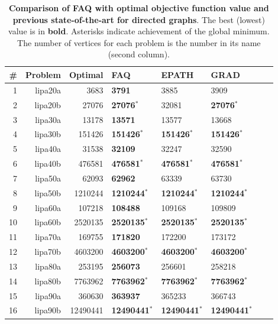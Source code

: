 \documentclass[10pt]{article}
\begin{document}
\begin{table}[h!]
\caption{{\bf Comparison of FAQ with optimal objective function value and previous state-of-the-art for directed graphs}.  The best (lowest) value is in \textbf{bold}. Asterisks indicate achievement of the global minimum.  The number of vertices for each problem is the number in its name (second column).}
\begin{center}
\begin{tabular}{|r|r|r||l|l|l|l|l|}
	\hline 
	          \# &  Problem &      Optimal & FAQ & EPATH & GRAD \\
	\hline 
	           1 &  lipa20a &     3683 & \textbf{3791} &     3885 &     3909 \\ 
	           2 &  lipa20b &    27076 & \textbf{27076}$^*$ &    32081 &    \textbf{27076}$^*$ \\ 
	           3 &  lipa30a &    13178 & \textbf{13571} 	&    13577 &    13668 \\ 
	           4 &  lipa30b &   151426 & \textbf{151426}$^*$ & \textbf{151426}$^*$ &   \textbf{151426}$^*$ \\ 
	           5 &  lipa40a &    31538 & \textbf{32109} 	&    32247 &    32590 \\ 
	           6 &  lipa40b &   476581 & \textbf{476581}$^*$ &   \textbf{476581}$^*$ &   \textbf{476581}$^*$ \\ 
	           7 &  lipa50a &    62093 & \textbf{62962} &    63339 &    63730 \\ 
	           8 &  lipa50b &  1210244 & \textbf{1210244}$^*$ &  \textbf{1210244}$^*$ &  \textbf{1210244}$^*$ \\ 
	           9 &  lipa60a &   107218 & \textbf{108488} &   109168 &   109809 \\ 
	          10 &  lipa60b &  2520135 & \textbf{2520135}$^*$ &  \textbf{2520135}$^*$ &  \textbf{2520135}$^*$ \\ 
	          11 &  lipa70a &   169755 & \textbf{171820} &   172200 &   173172 \\ 
	          12 &  lipa70b &  4603200 & \textbf{4603200}$^*$ &  \textbf{4603200}$^*$ &  \textbf{4603200}$^*$ \\ 
	          13 &  lipa80a &   253195 & \textbf{256073} &   256601 &   258218 \\ 
	          14 &  lipa80b &  7763962 & \textbf{7763962}$^*$ &  \textbf{7763962}$^*$ &  \textbf{7763962}$^*$ \\ 
	          15 &  lipa90a &   360630 & \textbf{363937} &   365233 &   366743 \\ 
	          16 &  lipa90b & 12490441 & \textbf{12490441}$^*$ & \textbf{12490441}$^*$ & \textbf{12490441}$^*$ \\ 
	\hline
	\end{tabular}
\end{center}
\label{tab:directed}
\end{table}
\end{document}
